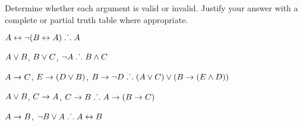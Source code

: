 \noindent\problempart Determine whether each argument is valid or invalid. Justify your answer with a complete or partial truth table where appropriate.
\label{pr.TT.valid6} 
\begin{earg}
\item $A\leftrightarrow\neg(B\leftrightarrow A)\mathrel{\ldotp\dot{}\,\ldotp} A$ %
\item $A\vee B$, $B\vee C$, $\neg A\mathrel{\ldotp\dot{}\,\ldotp} B \wedge C$ %
\item $A \rightarrow C$, $E \rightarrow (D \vee B)$, $B \rightarrow \neg D\mathrel{\ldotp\dot{}\,\ldotp} (A \vee C) \vee (B \rightarrow (E \wedge D))$ %
\item $A \vee B$, $C \rightarrow A$, $C \rightarrow B\mathrel{\ldotp\dot{}\,\ldotp} A \rightarrow (B \rightarrow C)$ %
\item $A \rightarrow B$, $\neg B \vee A\mathrel{\ldotp\dot{}\,\ldotp} A \leftrightarrow B$ %
\end{earg}

